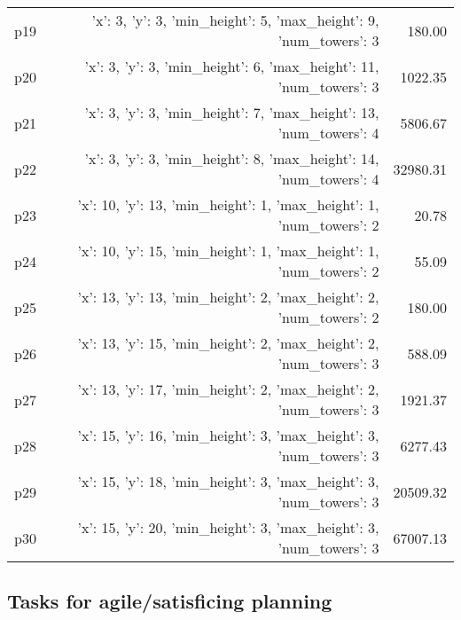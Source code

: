 \documentclass{article}
\begin{document}
\begin{center}
\begin{tabular}{@{}l|r|r@{}}
  p19&{'x': 3, 'y': 3, 'min\_height': 5, 'max\_height': 9, 'num\_towers': 3}&180.00\\
  p20&{'x': 3, 'y': 3, 'min\_height': 6, 'max\_height': 11, 'num\_towers': 3}&1022.35\\
  p21&{'x': 3, 'y': 3, 'min\_height': 7, 'max\_height': 13, 'num\_towers': 4}&5806.67\\
  p22&{'x': 3, 'y': 3, 'min\_height': 8, 'max\_height': 14, 'num\_towers': 4}&32980.31\\
  p23&{'x': 10, 'y': 13, 'min\_height': 1, 'max\_height': 1, 'num\_towers': 2}&20.78\\
  p24&{'x': 10, 'y': 15, 'min\_height': 1, 'max\_height': 1, 'num\_towers': 2}&55.09\\
  p25&{'x': 13, 'y': 13, 'min\_height': 2, 'max\_height': 2, 'num\_towers': 2}&180.00\\
  p26&{'x': 13, 'y': 15, 'min\_height': 2, 'max\_height': 2, 'num\_towers': 3}&588.09\\
  p27&{'x': 13, 'y': 17, 'min\_height': 2, 'max\_height': 2, 'num\_towers': 3}&1921.37\\
  p28&{'x': 15, 'y': 16, 'min\_height': 3, 'max\_height': 3, 'num\_towers': 3}&6277.43\\
  p29&{'x': 15, 'y': 18, 'min\_height': 3, 'max\_height': 3, 'num\_towers': 3}&20509.32\\
  p30&{'x': 15, 'y': 20, 'min\_height': 3, 'max\_height': 3, 'num\_towers': 3}&67007.13
                            \end{tabular}
                            \end{center}
                    

                                \subsection*{Tasks for agile/satisficing planning}
                                
\end{document}
